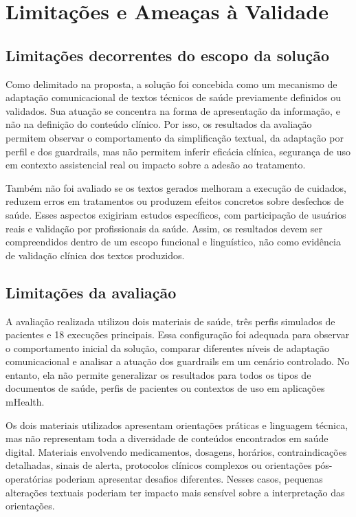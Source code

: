 \chapter{Limitações e Ameaças à Validade}
\label{cap:limitacoes}

\section{Limitações decorrentes do escopo da solução}
\label{sec:limitacoes-escopo-solucao}

Como delimitado na proposta, a solução foi concebida como um mecanismo de adaptação comunicacional de textos técnicos de saúde previamente definidos ou validados. Sua atuação se concentra na forma de apresentação da informação, e não na definição do conteúdo clínico. Por isso, os resultados da avaliação permitem observar o comportamento da simplificação textual, da adaptação por perfil e dos guardrails, mas não permitem inferir eficácia clínica, segurança de uso em contexto assistencial real ou impacto sobre a adesão ao tratamento.

Também não foi avaliado se os textos gerados melhoram a execução de cuidados, reduzem erros em tratamentos ou produzem efeitos concretos sobre desfechos de saúde. Esses aspectos exigiriam estudos específicos, com participação de usuários reais e validação por profissionais da saúde. Assim, os resultados devem ser compreendidos dentro de um escopo funcional e linguístico, não como evidência de validação clínica dos textos produzidos.

\section{Limitações da avaliação}
\label{sec:limitacoes-avaliacao}

A avaliação realizada utilizou dois materiais de saúde, três perfis simulados de pacientes e 18 execuções principais. Essa configuração foi adequada para observar o comportamento inicial da solução, comparar diferentes níveis de adaptação comunicacional e analisar a atuação dos guardrails em um cenário controlado. No entanto, ela não permite generalizar os resultados para todos os tipos de documentos de saúde, perfis de pacientes ou contextos de uso em aplicações mHealth.

Os dois materiais utilizados apresentam orientações práticas e linguagem técnica, mas não representam toda a diversidade de conteúdos encontrados em saúde digital. Materiais envolvendo medicamentos, dosagens, horários, contraindicações detalhadas, sinais de alerta, protocolos clínicos complexos ou orientações pós-operatórias poderiam apresentar desafios diferentes. Nesses casos, pequenas alterações textuais poderiam ter impacto mais sensível sobre a interpretação das orientações.

